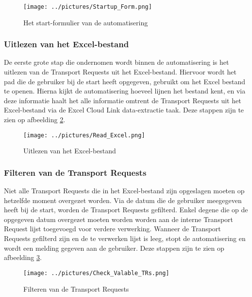 \begin{figure}
    \centering
    \texttt{[image: ../pictures/Startup\_Form.png]}
    \caption{Het start-formulier van de automatisering}
    \label{fig:startup-formulier}
\end{figure}

\subsubsection{Uitlezen van het Excel-bestand}
\label{subsubsec:uitlezen-excel}

De eerste grote stap die ondernomen wordt binnen de automatisering is het uitlezen van de Transport Requests uit het Excel-bestand. Hiervoor wordt het pad die de gebruiker bij de start heeft opgegeven, gebruikt om het Excel bestand te openen. Hierna kijkt de automatisering hoeveel lijnen het bestand kent, en via deze informatie haalt het alle informatie omtrent de Transport Requests uit het Excel-bestand via de Excel Cloud Link data-extractie taak.
Deze stappen zijn te zien op afbeelding \ref{fig:excel-lezen}.

\begin{figure}
    \centering
    \texttt{[image: ../pictures/Read\_Excel.png]}
    \caption{Uitlezen van het Excel-bestand}
    \label{fig:excel-lezen}
\end{figure}

\subsubsection{Filteren van de Transport Requests}
\label{subsubsec:filteren-transport-requests}

Niet alle Transport Requests die in het Excel-bestand zijn opgeslagen moeten op hetzelfde moment overgezet worden. Via de datum die de gebruiker meegegeven heeft bij de start, worden de Transport Requests gefilterd. Enkel degene die op de opgegeven datum overgezet moeten worden worden aan de interne Transport Request lijst toegevoegd voor verdere verwerking.
Wanneer de Transport Requests gefilterd zijn en de te verwerken lijst is leeg, stopt de automatisering en wordt een melding gegeven aan de gebruiker.
Deze stappen zijn te zien op afbeelding \ref{fig:filter-transport-requests}.

\begin{figure}
    \centering
    \texttt{[image: ../pictures/Check\_Valable\_TRs.png]}
    \caption{Filteren van de Transport Requests}
    \label{fig:filter-transport-requests}
\end{figure}

